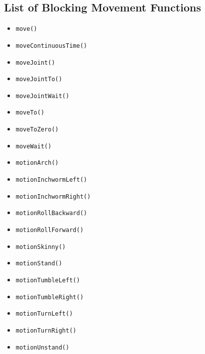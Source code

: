 \documentclass{article}
\begin{document}
\subsection{List of Blocking Movement Functions}
\begin{itemize}
\item \texttt{move()}
\item \texttt{moveContinuousTime()}
\item \texttt{moveJoint()}
\item \texttt{moveJointTo()}
\item \texttt{moveJointWait()}
\item \texttt{moveTo()}
\item \texttt{moveToZero()}
\item \texttt{moveWait()}
\item \texttt{motionArch()}
\item \texttt{motionInchwormLeft()}
\item \texttt{motionInchwormRight()}
\item \texttt{motionRollBackward()}
\item \texttt{motionRollForward()}
\item \texttt{motionSkinny()}
\item \texttt{motionStand()}
\item \texttt{motionTumbleLeft()}
\item \texttt{motionTumbleRight()}
\item \texttt{motionTurnLeft()}
\item \texttt{motionTurnRight()}
\item \texttt{motionUnstand()}
\end{itemize}
\end{document}
